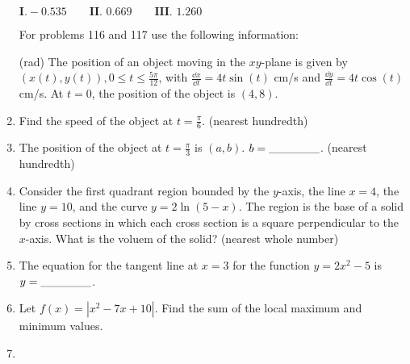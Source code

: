 \documentclass[../uilmath.tex]{subfiles}
\begin{document}
\begin{enumerate}[label=\bfseries\arabic*.]
    $\textbf{I.} -0.535 \qquad \textbf{II. } 0.669 \qquad \textbf{III. } 1.260$


    For problems 116 and 117 use the following information:

    (rad) The position of an object moving in the $xy$-plane is given by $(x(t),y(t)), 0\leq t\leq \frac{5\pi}{12}$, with $\frac{\dd x}{\dd t} = 4t\sin(t)$ cm/s and 
    $\frac{\dd y}{\dd t} = 4t\cos(t)$ cm/s. At $t=0$, the position of the object is $(4,8)$.
    \item %
    Find the speed of the object at $t=\frac{\pi}{6}$. (nearest hundredth)

    \item %
    The position of the object at $t=\frac{\pi}{3}$ is $(a,b)$. $b=\_\_\_\_\_\_$. (nearest hundredth)

    \item %
    Consider the first quadrant region bounded by the $y$-axis, the line $x=4$, the line $y=10$, and the curve $y=2\ln(5-x)$. The region is the base of a solid 
    by cross sections in which each cross section is a square perpendicular to the $x$-axis. What is the voluem of the solid? (nearest whole number)

    \item %
    The equation for the tangent line at $x=3$ for the function $y=2x^2-5$ is $y=\_\_\_\_\_\_$.

    \item %
    Let $f(x)=|x^2-7x+10|$. Find the sum of the local maximum and minimum values.

    \item %
    
    
\end{enumerate}
\end{document}
